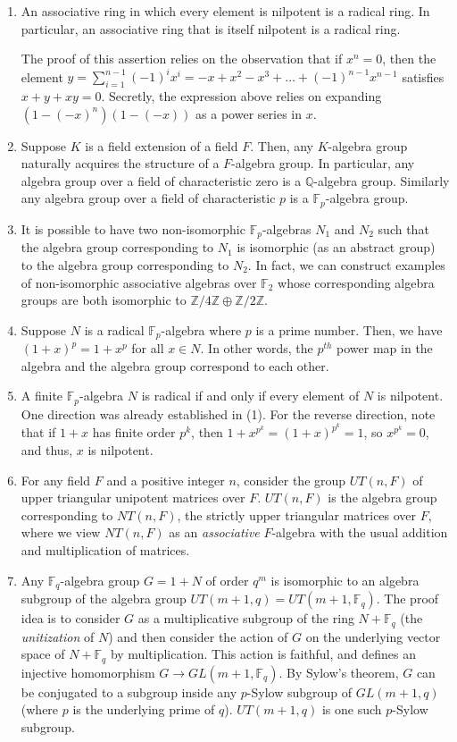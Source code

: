 \begin{enumerate}
\item An associative ring in which every element is nilpotent is a
  radical ring. In particular, an associative ring that is itself
  nilpotent is a radical ring.

  The proof of this assertion relies on the observation that if $x^n =
  0$, then the element $y = \sum_{i=1}^{n-1} (-1)^ix^i = -x + x^2 -
  x^3 + \dots + (-1)^{n-1}x^{n-1}$ satisfies $x + y + xy =
  0$. Secretly, the expression above relies on expanding $(1 -
  (-x)^n)(1 - (-x))$ as a power series in $x$.
\item Suppose $K$ is a field extension of a field $F$. Then, any
  $K$-algebra group naturally acquires the structure of a $F$-algebra
  group. In particular, any algebra group over a field of
  characteristic zero is a $\mathbb{Q}$-algebra group. Similarly any
  algebra group over a field of characteristic $p$ is a
  $\mathbb{F}_p$-algebra group.
\item It is possible to have two non-isomorphic
  $\mathbb{F}_p$-algebras $N_1$ and $N_2$ such that the algebra group
  corresponding to $N_1$ is isomorphic (as an abstract group) to the algebra group
  corresponding to $N_2$. In fact, we can construct examples of
  non-isomorphic associative algebras over $\mathbb{F}_2$ whose
  corresponding algebra groups are both isomorphic to
  $\mathbb{Z}/4\mathbb{Z} \oplus \mathbb{Z}/2\mathbb{Z}$.
\item Suppose $N$ is a radical $\mathbb{F}_p$-algebra where $p$ is a
  prime number. Then, we have $(1 + x)^p = 1 + x^p$ for all $x \in
  N$. In other words, the $p^{th}$ power map in the algebra and the
  algebra group correspond to each other.
\item A finite $\mathbb{F}_p$-algebra $N$ is radical if and only if
  every element of $N$ is nilpotent. One direction was already
  established in (1). For the reverse direction, note that if $1 + x$ has
  finite order $p^k$, then $1 + x^{p^k} = (1 + x)^{p^k} = 1$, so
  $x^{p^k} = 0$, and thus, $x$ is nilpotent.
\item For any field $F$ and a positive integer $n$, consider the group
  $UT(n,F)$ of upper triangular unipotent matrices over $F$. $UT(n,F)$
  is the algebra group corresponding to $NT(n,F)$, the strictly upper
  triangular matrices over $F$, where we view $NT(n,F)$ as an {\em
    associative} $F$-algebra with the usual addition and
  multiplication of matrices.
\item Any $\mathbb{F}_q$-algebra group $G = 1 + N$ of order $q^m$ is
  isomorphic to an algebra subgroup of the algebra group $UT(m+1,q) =
  UT(m+1,\mathbb{F}_q)$. The proof idea is to consider $G$ as a
  multiplicative subgroup of the ring $N + \mathbb{F}_q$ (the {\em
    unitization} of $N$) and then consider the action of $G$ on the
  underlying vector space of $N + \mathbb{F}_q$ by
  multiplication. This action is faithful, and defines an injective
  homomorphism $G \to GL(m+1,\mathbb{F}_q)$. By Sylow's theorem, $G$
  can be conjugated to a subgroup inside any $p$-Sylow subgroup of
  $GL(m+1,q)$ (where $p$ is the underlying prime of $q$). $UT(m+1,q)$
  is one such $p$-Sylow subgroup.
\end{enumerate}

